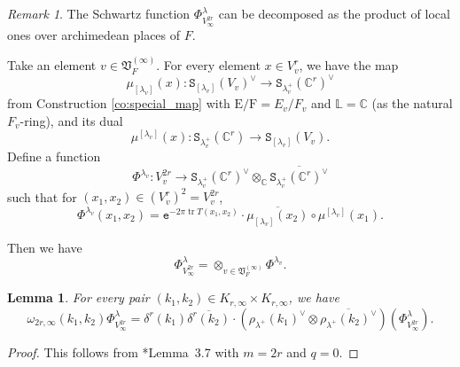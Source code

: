 \documentclass[12pt]{amsart}
\numberwithin{equation}{section}
\theoremstyle{plain}
\newtheorem{lem}[proposition]{Lemma}
\theoremstyle{definition}
\theoremstyle{remark}
\newtheorem{remark}[proposition]{Remark}
\renewcommand{\d}[1]{\mathbb{#1}}
\newcommand{\f}[1]{\mathfrak{#1}}
\renewcommand{\r}[1]{\mathrm{#1}}
\renewcommand{\(}{\left(}
\renewcommand{\)}{\right)}
\newcommand{\ol}[1]{\overline{#1}{}}
\newcommand{\dC}{\d C}
\newcommand{\dL}{\d L}
\newcommand{\fV}{\f V}
\newcommand{\rE}{\r E}
\newcommand{\rF}{\r F}
\newcommand{\tS}{\mathtt{S}}
\newcommand{\te}{\mathtt{e}}
\DeclareMathOperator{\tr}{tr}
\begin{document}
\begin{remark}\label{re:doubling_schwartz}
The Schwartz function $\Phi_{V_\infty^{2r}}^\lambda$ can be decomposed as the product of local ones over archimedean places of $F$.

Take an element $v\in\fV_F^{(\infty)}$. For every element $x\in V_v^r$, we have the map
\[
\mu_{[\lambda_v]}(x)\colon\tS_{[\lambda_v]}(V_v)^\vee\to\tS_{\lambda_v^+}(\dC^r)^\vee
\]
from Construction \ref{co:special_map} with $\rE/\rF=E_v/F_v$ and $\dL=\dC$ (as the natural $F_v$-ring), and its dual
\[
\mu^{[\lambda_v]}(x)\colon\tS_{\lambda_v^+}(\dC^r)\to\tS_{[\lambda_v]}(V_v).
\]
Define a function
\[
\Phi^{\lambda_v}\colon V_v^{2r}\to
\tS_{\lambda_v^+}(\dC^r)^\vee\otimes_\dC\ol{\tS_{\lambda_v^+}(\dC^r)^\vee}
\]
such that for $(x_1,x_2)\in(V_v^r)^2=V_v^{2r}$,
\[
\Phi^{\lambda_v}(x_1,x_2)=\te^{-2\pi\tr T(x_1,x_2)}\cdot\ol{\mu_{[\lambda_v]}(x_2)}\circ\mu^{[\lambda_v]}(x_1).
\]

Then we have
\[
\Phi_{V_\infty^{2r}}^\lambda=\otimes_{v\in\fV_F^{(\infty)}}\Phi^{\lambda_v}.
\]
\end{remark}




\begin{lem}\label{le:doubling_schwartz}
For every pair $(k_1,k_2)\in K_{r,\infty}\times K_{r,\infty}$, we have
\[
\omega_{2r,\infty}(k_1,k_2)\Phi^\lambda_{V_\infty^{2r}}
=\delta^r(k_1)\ol{\delta^r(k_2)}\cdot
\(\rho_{\lambda^+}(k_1)^\vee\otimes\ol{\rho_{\lambda^+}(k_2)^\vee}\)(\Phi^\lambda_{V_\infty^{2r}}).
\]
\end{lem}

\begin{proof}
This follows from \cite{Liu26}*{Lemma~3.7} with $m=2r$ and $q=0$.
\end{proof}
\end{document}
